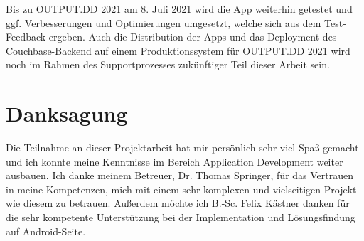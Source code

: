 \noindent Bis zu OUTPUT.DD 2021 am 8. Juli 2021 wird die App weiterhin getestet und ggf. Verbesserungen und Optimierungen umgesetzt, welche sich aus dem Test-Feedback ergeben. Auch die Distribution der Apps und das Deployment des Couchbase-Backend auf einem Produktionssystem für OUTPUT.DD 2021 wird noch im Rahmen des Supportprozesses zukünftiger Teil dieser Arbeit sein.

\section{Danksagung}

Die Teilnahme an dieser Projektarbeit hat mir persönlich sehr viel Spaß gemacht und ich konnte meine Kenntnisse im Bereich Application Development weiter ausbauen. Ich danke meinem Betreuer, Dr. Thomas Springer, für das Vertrauen in meine Kompetenzen, mich mit einem sehr komplexen und vielseitigen Projekt wie diesem zu betrauen. Außerdem möchte ich B.-Sc. Felix Kästner danken für die sehr kompetente Unterstützung bei der Implementation und Lösungsfindung auf Android-Seite.
